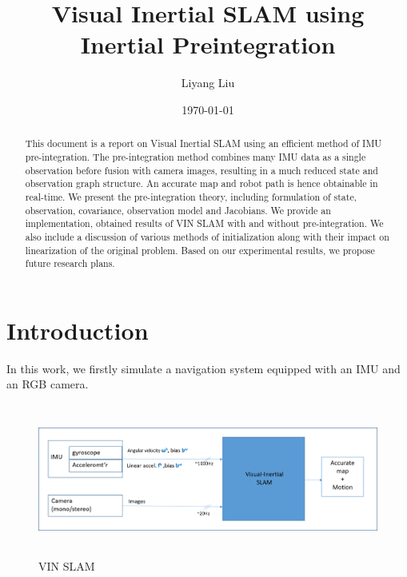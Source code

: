 \documentclass[12pt]{article}   %
\begin{document}


\title{Visual Inertial SLAM using Inertial Preintegration}
\author{Liyang Liu}
\date{\today}

\maketitle

\begin{abstract}
This document is a report on Visual Inertial SLAM using an efficient method of IMU pre-integration. The pre-integration method combines many IMU data as a single observation before fusion with camera images, resulting in a much reduced state and observation graph structure. An accurate map and robot path is hence obtainable in real-time. We present the pre-integration theory, including formulation of state, observation, covariance, observation model and Jacobians. We provide an implementation, obtained results of VIN SLAM with and without pre-integration. We also include a discussion of various methods of initialization along with their impact on linearization of the original problem. Based on our experimental results, we propose future research plans.
\end{abstract}

\newpage

\tableofcontents

\newpage

\section{Introduction}

\vspace{1cm}
In this work, we firstly simulate a navigation system equipped with an IMU and an RGB camera. 
\begin{figure}[ht]
	\label{fig:vin}
	\includegraphics[height=5cm]{figures/VIN_block-diagram.png}
	\caption{VIN SLAM}
\end{figure}
\end{document}
